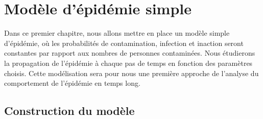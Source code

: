 \documentclass[12pt,a4paper]{report}
\theoremstyle{remark}
\begin{document}
\chapter{Modèle d'épidémie simple}

Dans ce premier chapitre, nous allons mettre en place un modèle simple d'épidémie, où les probabilités de contamination, infection et inaction seront constantes par rapport aux nombres de personnes contaminées. Nous étudierons la propagation de l'épidémie à chaque pas de temps en fonction des paramètres choisis. Cette modélisation sera pour nous une première approche de l'analyse du comportement de l'épidémie en temps long.

\section{Construction du modèle}
\vspace{0.6cm}
\end{document}

